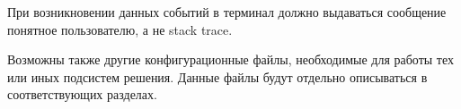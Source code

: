 При возникновении данных событий в терминал должно выдаваться сообщение
понятное пользователю, а не stack trace.

Возможны также другие конфигурационные файлы, необходимые для работы
тех или иных подсистем решения. Данные файлы будут отдельно описываться
в соответствующих разделах. 







